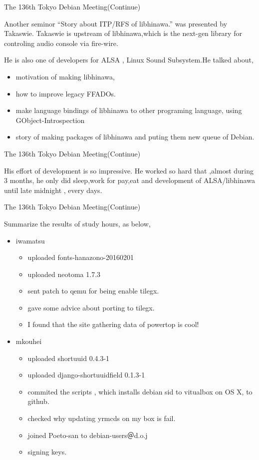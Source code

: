 \begin{frame}{The 136th Tokyo Debian Meeting(Continue)}

  Another seminor ``Story about ITP/RFS of libhinawa.'' was presented by Takaswie. Takaswie is upstream of libhinawa,which is the next-gen library for controling audio console via fire-wire.

  He is also one of developers for ALSA , Linux Sound Subsystem.He talked about,
  \begin{itemize}
  \item motivation of making libhinawa,
  \item how to improve legacy FFADOs.
  \item make language bindings of libhinawa to other programing language,
    using GObject-Introspection
  \item story of making packages of libhinawa and puting them new queue of Debian.
  \end{itemize}
\end{frame}
\begin{frame}{The 136th Tokyo Debian Meeting(Continue)}

  His effort of development is so impressive.
  He worked so hard that ,almost during 3 months, he only did sleep,work for pay,eat and development of ALSA/libhinawa until late midnight , every days.

\end{frame}

\begin{frame}{The 136th Tokyo Debian Meeting(Continue)}

 Summarize the results of study hours, as below,

\begin{itemize}
\item iwamatsu \\
  \begin{itemize}
   \item uploaded fonts-hanazono-20160201
   \item uploaded neotoma 1.7.3
   \item sent patch to qemu for being enable tilegx.
   \item gave some advice about porting to tilegx.
   \item I found that the site gathering data of powertop is cool!
  \end{itemize}
\item mkouhei\\
  \begin{itemize}
  \item uploaded shortuuid 0.4.3-1
  \item uploaded django-shortuuidfield 0.1.3-1
  \item commited the scripts , which installs debian sid to vitualbox on OS X, to github.
  \item checked why updating yrmcds on my box is fail.
  \item joined Poeto-san to debian-users＠d.o.j
  \item signing keys.
  \end{itemize}
\end{itemize}
\end{frame}

